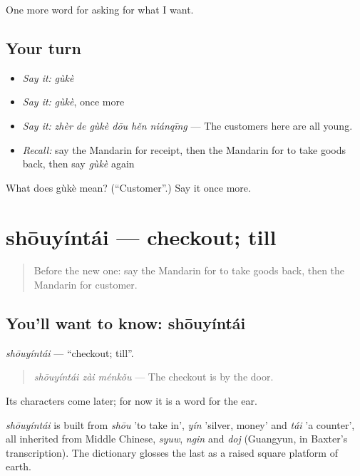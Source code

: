 \begin{grammarlens}[title={What you've built}]
One more word for asking for what I want.
\end{grammarlens}

\subsection*{Your turn}
\begin{itemize}
\raggedright
  \item \emph{Say it:} \emph{gùkè}
  \item \emph{Say it:} \emph{gùkè}, once more
  \item \emph{Say it:} \emph{zhèr de gùkè dōu hěn niánqīng} — The customers here are all young.
  \item \emph{Recall:} say the Mandarin for receipt, then the Mandarin for to take goods back, then say \emph{gùkè} again
\end{itemize}

\begin{tcolorbox}[breakable,colback=teal!4,colframe=teal!35!black,title={Before you move on}]
What does gùkè mean? (\textquotedblleft{}Customer\textquotedblright{}.) Say it once more.
\end{tcolorbox}
\section[shōuyíntái]{shōuyíntái — checkout; till}

\label{lesson:ZH-C202-shouyintai}



\begin{quote}
Before the new one: say the Mandarin for to take goods back, then the Mandarin for customer.
\end{quote}

\subsection*{You'll want to know: shōuyíntái}
\emph{shōuyíntái} — \textquotedblleft{}checkout; till\textquotedblright{}.

\begin{quote}
\emph{shōuyíntái zài ménkǒu} — The checkout is by the door.
\end{quote}

Its characters come later; for now it is a word for the ear.

\begin{cousinweb}
\emph{shōuyíntái} is built from \emph{shōu} 'to take in', \emph{yín} 'silver, money' and \emph{tái} 'a counter', all inherited from Middle Chinese, \emph{syuw}, \emph{ngin} and \emph{doj} (Guangyun, in Baxter's transcription). The dictionary glosses the last as a raised square platform of earth.
\end{cousinweb}

